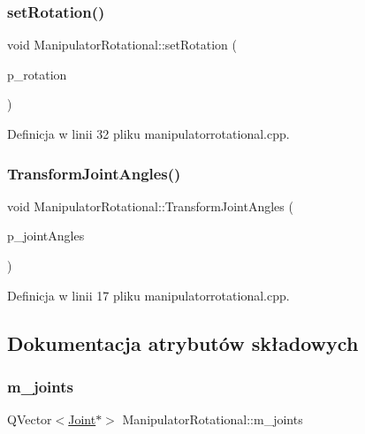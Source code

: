 \subsubsection{\texorpdfstring{set\+Rotation()}{setRotation()}}
{\footnotesize\ttfamily void Manipulator\+Rotational\+::set\+Rotation (\begin{DoxyParamCaption}\item[{float}]{p\+\_\+rotation }\end{DoxyParamCaption})}



Definicja w linii 32 pliku manipulatorrotational.\+cpp.

\mbox{\label{class_manipulator_rotational_ab782bff373e4b6c7b2f75bd5dbfd2435}} 
\subsubsection{\texorpdfstring{Transform\+Joint\+Angles()}{TransformJointAngles()}}
{\footnotesize\ttfamily void Manipulator\+Rotational\+::\+Transform\+Joint\+Angles (\begin{DoxyParamCaption}\item[{Q\+Vector$<$ float $>$}]{p\+\_\+joint\+Angles }\end{DoxyParamCaption})}



Definicja w linii 17 pliku manipulatorrotational.\+cpp.



\subsection{Dokumentacja atrybutów składowych}
\mbox{\label{class_manipulator_rotational_a31303c0a6c8a03f3cd0754aec802a808}} 
\subsubsection{\texorpdfstring{m\+\_\+joints}{m\_joints}}
{\footnotesize\ttfamily Q\+Vector$<$\hyperlink{class_joint}{Joint}$\ast$$>$ Manipulator\+Rotational\+::m\+\_\+joints\hspace{0.3cm}{\ttfamily [protected]}}



